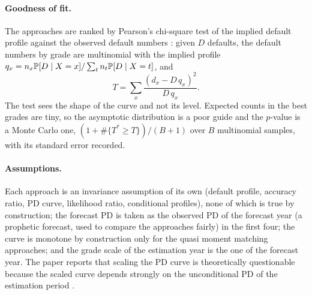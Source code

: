 \paragraph{Goodness of fit.} The approaches are ranked by Pearson's chi-square test of the implied default profile against the observed default numbers \citep{ratings:pearson1900}: given $D$ defaults, the default numbers by grade are multinomial with the implied profile $q_x=n_x\mathbb{P}[D\mid X=x]/\sum_t n_t\mathbb{P}[D\mid X=t]$, and
\begin{equation}
T=\sum_x\frac{(d_x-D\,q_x)^2}{D\,q_x}.
\label{eq:ratings-chi2}
\end{equation}
The test sees the shape of the curve and not its level. Expected counts in the best grades are tiny, so the asymptotic distribution is a poor guide and the $p$-value is a Monte Carlo one, $(1+\#\{T^{*}\ge T\})/(B+1)$ over $B$ multinomial samples, with its standard error recorded.

\paragraph{Assumptions.} Each approach is an invariance assumption of its own (default profile, accuracy ratio, PD curve, likelihood ratio, conditional profiles), none of which is true by construction; the forecast PD is taken as the observed PD of the forecast year (a prophetic forecast, used to compare the approaches fairly) in the first four; the curve is monotone by construction only for the quasi moment matching approaches; and the grade scale of the estimation year is the one of the forecast year. The paper reports that scaling the PD curve is theoretically questionable because the scaled curve depends strongly on the unconditional PD of the estimation period \citep{ratings:tasche2013}.

